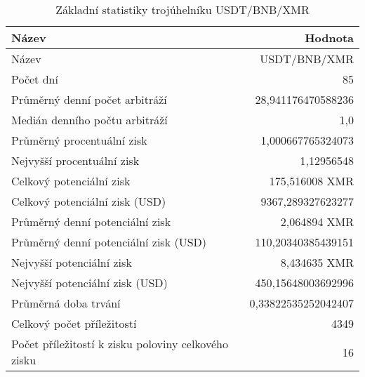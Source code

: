 \begin{table}\centering
\caption{Základní statistiky trojúhelníku USDT/BNB/XMR}
\label{USDTBNBXMR_stats}
\begin{tabular}{|| l | r ||}
\hline Název & Hodnota \\ 
\hline\hline Název & USDT/BNB/XMR \\ 
\hline Počet dní & 85 \\ 
\hline Průměrný denní počet arbitráží & 28,941176470588236 \\ 
\hline Medián denního počtu arbitráží & 1,0 \\ 
\hline Průměrný procentuální zisk & 1,000667765324073 \\ 
\hline Nejvyšší procentuální zisk & 1,12956548 \\ 
\hline Celkový potenciální zisk & 175,516008 XMR \\ 
\hline Celkový potenciální zisk (USD) & 9367,289327623277 \\ 
\hline Průměrný denní potenciální zisk & 2,064894 XMR \\ 
\hline Průměrný denní potenciální zisk (USD) & 110,20340385439151 \\ 
\hline Nejvyšší potenciální zisk & 8,434635 XMR \\ 
\hline Nejvyšší potenciální zisk (USD) & 450,15648003692996 \\ 
\hline Průměrná doba trvání & 0,33822535252042407 \\ 
\hline Celkový počet příležitostí & 4349 \\ 
\hline Počet příležitostí k zisku poloviny celkového zisku & 16 \\ 
\hline
\end{tabular}
\end{table}